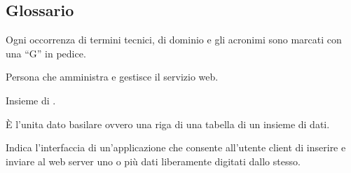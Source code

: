 	\subsection{Glossario}
	Ogni occorrenza di termini tecnici, di dominio e gli acronimi sono marcati con una ``G'' in pedice.

	Persona che amministra e gestisce il servizio web.

	Insieme di .

	\`E l'unita dato basilare ovvero una riga di una tabella di un insieme di dati.

	Indica l'interfaccia di un'applicazione che consente all'utente client di inserire e inviare al web server uno o più dati liberamente digitati dallo stesso. 


